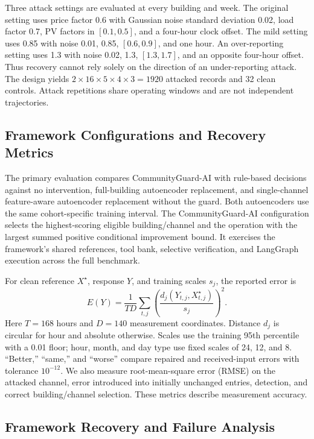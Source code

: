 \documentclass[conference]{IEEEtran}
\begin{document}
Three attack settings are evaluated at every building and week. The original setting uses price factor 0.6 with Gaussian noise standard deviation 0.02, load factor 0.7, PV factors in $[0.1,0.5]$, and a four-hour clock offset. The mild setting uses 0.85 with noise 0.01, 0.85, $[0.6,0.9]$, and one hour. An over-reporting setting uses 1.3 with noise 0.02, 1.3, $[1.3,1.7]$, and an opposite four-hour offset. Thus recovery cannot rely solely on the direction of an under-reporting attack. The design yields $2\times16\times5\times4\times3=1920$ attacked records and 32 clean controls. Attack repetitions share operating windows and are not independent trajectories.

\subsection{Framework Configurations and Recovery Metrics}

The primary evaluation compares CommunityGuard-AI with rule-based decisions against no intervention, full-building autoencoder replacement, and single-channel feature-aware autoencoder replacement without the guard. Both autoencoders use the same cohort-specific training interval. The CommunityGuard-AI configuration selects the highest-scoring eligible building/channel and the operation with the largest summed positive conditional improvement bound. It exercises the framework's shared references, tool bank, selective verification, and LangGraph execution across the full benchmark.

For clean reference $X^\star$, response $Y$, and training scales $s_j$, the reported error is
\begin{equation}
 E(Y)=\frac{1}{TD}\sum_{t,j}\left(\frac{d_j(Y_{t,j},X^\star_{t,j})}{s_j}\right)^2.
\end{equation}
Here $T=168$ hours and $D=140$ measurement coordinates. Distance $d_j$ is circular for hour and absolute otherwise. Scales use the training 95th percentile with a 0.01 floor; hour, month, and day type use fixed scales of 24, 12, and 8. ``Better,'' ``same,'' and ``worse'' compare repaired and received-input errors with tolerance $10^{-12}$. We also measure root-mean-square error (RMSE) on the attacked channel, error introduced into initially unchanged entries, detection, and correct building/channel selection. These metrics describe measurement accuracy.

\subsection{Framework Recovery and Failure Analysis}
\end{document}

